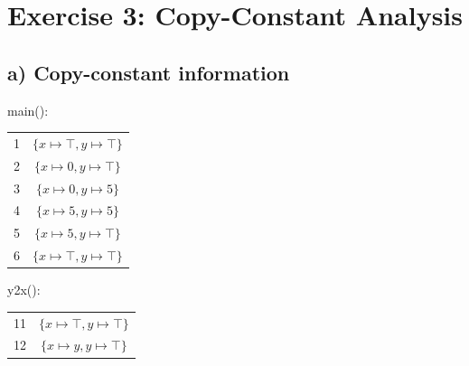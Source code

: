 \documentclass[11pt,a4paper]{scrartcl}
\begin{document}
\section*{Exercise 3: Copy-Constant Analysis}
\subsection*{a) Copy-constant information}
\begin{minipage}[t]{0.5\textwidth}
main():\\
\begin{tabular}{|c|c|}
\hline
1 & $\{x \mapsto \top, y \mapsto \top\}$ \\
2 & $\{x \mapsto 0, y \mapsto \top\}$ \\
3 & $\{x \mapsto 0, y \mapsto 5\}$ \\
4 & $\{x \mapsto 5, y \mapsto 5\}$ \\
5 & $\{x \mapsto 5, y \mapsto \top\}$ \\
6 & $\{x \mapsto \top, y \mapsto \top\}$ \\
\hline
\end{tabular}
\end{minipage}
\begin{minipage}[t]{0.5\textwidth}
y2x():\\
\begin{tabular}{|c|c|}
\hline
11 & $\{x \mapsto \top, y \mapsto \top\}$ \\
12 & $\{x \mapsto y, y \mapsto \top\}$ \\
\hline
\end{tabular}
\end{minipage}
\end{document}
